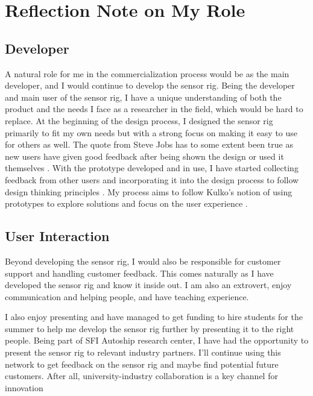 \documentclass{iopconfser}
\begin{document}
\pagebreak
\section*{Reflection Note on My Role}

\subsection*{Developer}
A natural role for me in the commercialization process would be as the main developer, and I would continue to develop the sensor rig.
Being the developer and main user of the sensor rig, I have a unique understanding of both the product and the needs I face as a researcher in the field, which would be hard to replace.
At the beginning of the design process, I designed the sensor rig primarily to fit my own needs but with a strong focus on making it easy to use for others as well.
The quote from Steve Jobs  has to some extent been true as new users have given good feedback after being shown the design or used it themselves \cite{jobsInterviewSteveJobs1998}.
With the prototype developed and in use, I have started collecting feedback from other users and incorporating it into the design process to follow design thinking principles \cite{sorheimUnderstandingValueUsers2024}.
My process aims to follow Kulko's notion of using prototypes to explore solutions and focus on the user experience \cite{kolkoDesignThinkingComes2015}.

\subsection*{User Interaction}

Beyond developing the sensor rig, I would also be responsible for customer support and handling customer feedback.
This comes naturally as I have developed the sensor rig and know it inside out.
I am also an extrovert, enjoy communication and helping people, and have teaching experience.

I also enjoy presenting and have managed to get funding to hire students for the summer to help me develop the sensor rig further by presenting it to the right people.
Being part of SFI Autoship research center, I have had the opportunity to present the sensor rig to relevant industry partners.
I'll continue using this network to get feedback on the sensor rig and maybe find potential future customers.
After all, university-industry collaboration is a key channel for innovation \cite[45-53]{kaloudisHowUniversitiesContribute2019}
\end{document}
